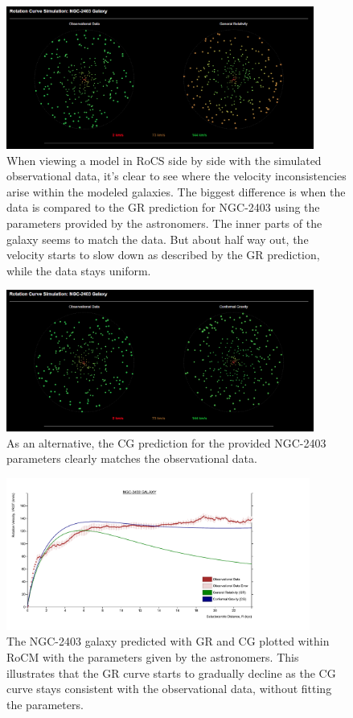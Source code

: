 \documentclass[conference]{IEEEtran-modified}
\begin{document}
\begin{figure}[h!]
\centering
\includegraphics[width=0.9\textwidth]{NGC-2403-GR}
\caption{When viewing a model in RoCS side by side with the simulated observational data, it's clear to see where the velocity inconsistencies arise within the modeled galaxies. The biggest difference is when the data is compared to the GR prediction for NGC-2403 using the parameters provided by the astronomers. The inner parts of the galaxy seems to match the data. But about half way out, the velocity starts to slow down as described by the GR prediction, while the data stays uniform.}
\label{ngc2403gr}
\end{figure}


\begin{figure}[h!]
\centering
\includegraphics[width=0.9\textwidth]{NGC-2403-CG}
\caption{As an alternative, the CG prediction for the provided NGC-2403 parameters clearly matches the observational data.}
\label{ngc2403cg}
\end{figure}


\begin{figure}[h!]
\centering
\includegraphics[width=0.89\textwidth]{NGC-2403-DEFAULT}
\caption{The NGC-2403 galaxy predicted with GR and CG plotted within RoCM with the parameters given by the astronomers. This illustrates that the GR curve starts to gradually decline as the CG curve stays consistent with the observational data, without fitting the parameters.}
\label{ngc2403defaultplot}
\end{figure}
\end{document}
